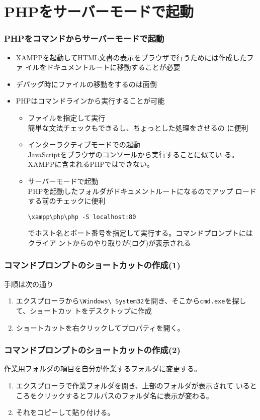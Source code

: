  \section{PHPをサーバーモードで起動}
\begin{frame}[containsverbatim]
 \frametitle{PHPをコマンドからサーバーモードで起動}
 \begin{itemize}
	\item XAMPPを起動してHTML文書の表示をブラウザで行うためには作成したファ
				イルをドキュメントルートに移動することが必要
	\item デバッグ時にファイルの移動をするのは面倒
	\item PHPはコマンドラインから実行することが可能
				\begin{itemize}
				 \item ファイルを指定して実行\\
							 簡単な文法チェックもできるし、ちょっとした処理をさせるの
							 に便利
				 \item インターラクティブモードでの起動\\
							 JavaScriptをブラウザのコンソールから実行することに似てい
							 る。XAMPPに含まれるPHPではできない。
				 \item サーバーモードで起動\\
							 PHPを起動したフォルダがドキュメントルートになるのでアップ
							 ロードする前のチェックに便利\\
\begin{Verbatim}
\xampp\php\php -S localhost:80	
\end{Verbatim}
でホスト名とポート番号を指定して実行する。コマンドプロンプトにはクライア
							 ントからのやり取りが(ログ)が表示される
				\end{itemize}
 \end{itemize}
\end{frame}
 \begin{frame}[containsverbatim]
	\frametitle{コマンドプロンプトのショートカットの作成(1)}
	手順は次の通り
	\begin{enumerate}
	 \item エクスプローラから\texttt{\textbackslash Windows\textbackslash
				 System32}を開き、そこから\texttt{cmd.exe}を探して、ショートカッ
				 トをデスクトップに作成
	 \item ショートカットを右クリックしてプロパティを開く。
	\end{enumerate}
\end{frame}
 \begin{frame}[containsverbatim]
	\frametitle{コマンドプロンプトのショートカットの作成(2)}
	 作業用フォルダの項目を自分が作業するフォルダに変更する。
				 \begin{enumerate}
					\item エクスプローラで作業フォルダを開き、上部のフォルダが表示されて
				 いるところをクリックするとフルパスのフォルダ名に表示が変わる。
					\item それをコピーして貼り付ける。
				 \end{enumerate}
 \end{frame}

\begin{frame}[containsverbatim]
\frametitle{}
\end{frame}
